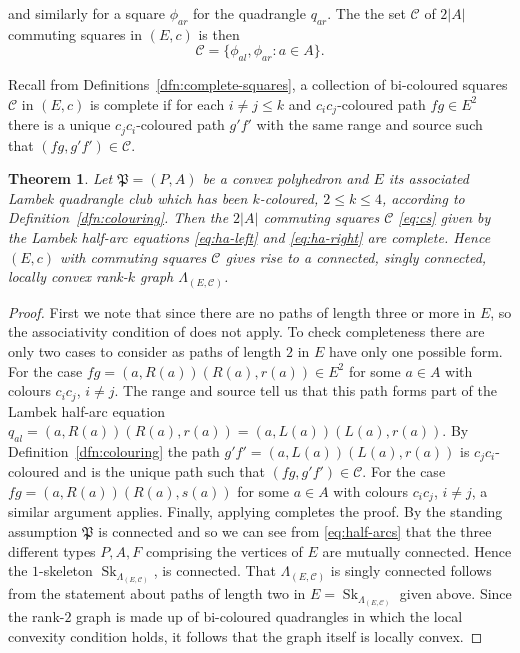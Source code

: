 \documentclass[12pt]{amsart}
\newtheorem{thm}{Theorem}[section]
\theoremstyle{definition}
\theoremstyle{remark}
\numberwithin{equation}{section}
\newcommand{\Cc}{\mathcal{C}}
\newcommand{\Sk}{\operatorname{Sk}}
\begin{document}
\noindent
and similarly for a square $\phi_{ar}$ for the quadrangle $q_{ar}$. The the set $\Cc$ of $2 |A|$ commuting squares in $(E,c)$ is then
\begin{equation} \label{eq:cs}
\Cc = \{ \phi_{al} , \phi_{ar} : a \in A \} .
\end{equation}

\noindent
Recall from Definitions~\ref{dfn:complete-squares}, a collection of bi-coloured squares $\Cc$ in $(E,c)$ is complete if for each $i \neq j \leq k$ and $c_ic_j$-coloured path $fg \in E^2$ there is a unique $c_jc_i$-coloured path $ g'f'$ with the same range and source such that $(fg, g'f') \in \Cc$.

\begin{thm} \label{thm:polygiveshrg}
Let $\mathfrak{P}=(P,A)$ be a convex polyhedron and $E$ its associated Lambek quadrangle club which has been $k$-coloured, $2 \le k \le 4$, according to Definition~\ref{dfn:colouring}. Then the $2|A|$ commuting squares $\mathcal{C}$ \eqref{eq:cs} given by the Lambek half-arc equations \eqref{eq:ha-left} and \eqref{eq:ha-right} are  complete.  Hence $(E,c)$ with commuting squares $\mathcal{C}$ gives rise to a connected, singly connected, locally convex rank-$k$ graph 
$\Lambda_{(E,\Cc)}$.
\end{thm}

\begin{proof}
First we note that since there are no paths of length three or more in $E$, so the associativity condition of \cite[\S 3]{hrsw} does not apply. 
To check completeness there are only two cases to consider as paths of length $2$ in $E$ have only one possible form. For the case $fg= (a,R(a)) (R(a),r(a)) \in E^2$ for some $a \in A$ with colours $c_i c_j$, $i \neq j$. The range and source tell us that this path forms part of the Lambek half-arc equation $q_{al} = (a,R(a)) (R(a),r(a)) = (a,L(a)) (L(a),r(a))$. By Definition~\ref{dfn:colouring} the path $g'f'= (a,L(a)) (L(a),r(a))$ is $c_jc_i$-coloured and  is the unique path such that $(fg,g'f') \in \Cc$. For the case $fg = (a,R(a))(R(a),s(a))$ for some $a \in A$ with colours $c_i c_j$, $i \neq j$, a similar argument applies. Finally, applying \cite[Theorem 4.5]{hrsw} completes the proof. By the standing assumption $\mathfrak{P}$ is connected and so we can see from \eqref{eq:half-arcs} that the three different types $P,A,F$ comprising the vertices of $E$ are mutually connected. Hence the $1$-skeleton $\Sk_{\Lambda_{(E,\Cc)}}$, is connected. That $\Lambda_{(E,\Cc)}$ is singly connected follows from the statement about paths of length two in $E = \Sk_{\Lambda_{(E,\Cc)}}$ given above.
Since the rank-$2$ graph is made up of bi-coloured quadrangles in which the local convexity condition holds, it follows that the graph itself is locally convex.
\end{proof}
\end{document}
